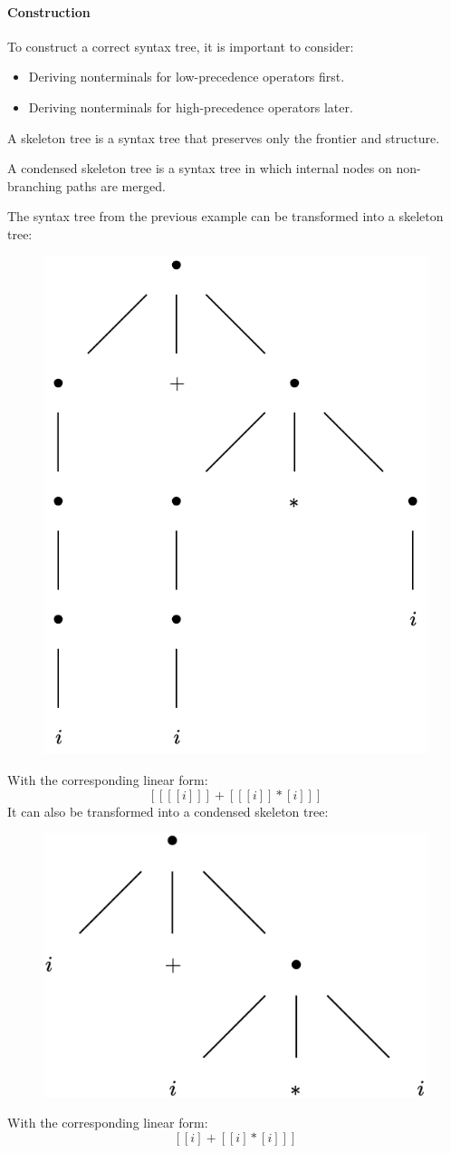 \paragraph*{Construction}
To construct a correct syntax tree, it is important to consider:
\begin{itemize}
    \item Deriving nonterminals for low-precedence operators first.
    \item Deriving nonterminals for high-precedence operators later.
\end{itemize}
\begin{definition}
    A skeleton tree is a syntax tree that preserves only the frontier and structure.
\end{definition}
\begin{definition}
    A condensed skeleton tree is a syntax tree in which internal nodes on non-branching paths are merged.
\end{definition}
\begin{example}
    The syntax tree from the previous example can be transformed into a skeleton tree:
    \begin{figure}[H]
        \centering
        \includegraphics[width=0.25\linewidth]{images/syntree1.png}
    \end{figure}
    With the corresponding linear form:
    \[[[[[i]]]+[[[i]]*[i]]]\]
    It can also be transformed into a condensed skeleton tree:
    \begin{figure}[H]
        \centering
        \includegraphics[width=0.25\linewidth]{images/syntree2.png}
    \end{figure}
    With the corresponding linear form:
    \[[[i]+[[i]*[i]]]\]
\end{example}